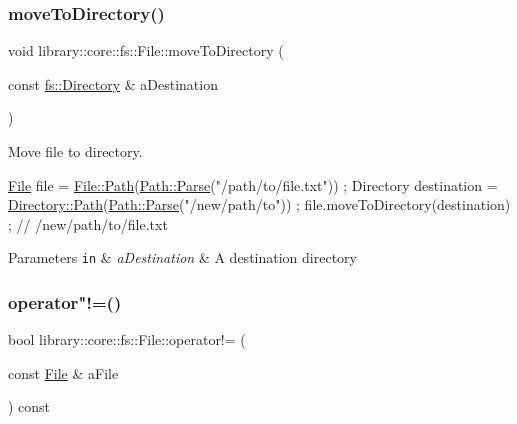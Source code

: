 \subsubsection{\texorpdfstring{move\+To\+Directory()}{moveToDirectory()}}
{\footnotesize\ttfamily void library\+::core\+::fs\+::\+File\+::move\+To\+Directory (\begin{DoxyParamCaption}\item[{const \hyperlink{classlibrary_1_1core_1_1fs_1_1_directory}{fs\+::\+Directory} \&}]{a\+Destination }\end{DoxyParamCaption})}



Move file to directory. 


\begin{DoxyCode}
\hyperlink{classlibrary_1_1core_1_1fs_1_1_file_a7490060f19a21d4ee58bb6cec87a1ca6}{File} file = \hyperlink{classlibrary_1_1core_1_1fs_1_1_file_a0e0d8a8becb3cdd21775554e181452d8}{File::Path}(\hyperlink{classlibrary_1_1core_1_1fs_1_1_path_aebf5bd3af83e0b7376616e146f3e55df}{Path::Parse}(\textcolor{stringliteral}{"/path/to/file.txt"})) ;
Directory destination = \hyperlink{classlibrary_1_1core_1_1fs_1_1_directory_a6d3ea04654841e62a4dbd99feb563caf}{Directory::Path}(\hyperlink{classlibrary_1_1core_1_1fs_1_1_path_aebf5bd3af83e0b7376616e146f3e55df}{Path::Parse}(\textcolor{stringliteral}{"/new/path/to"})) ;
file.moveToDirectory(destination) ; \textcolor{comment}{// /new/path/to/file.txt}
\end{DoxyCode}



\begin{DoxyParams}[1]{Parameters}
\mbox{\tt in}  & {\em a\+Destination} & A destination directory \\
\hline
\end{DoxyParams}
\mbox{\label{classlibrary_1_1core_1_1fs_1_1_file_a0354b6dd59250c07cd5a8b679dc36d95}} 
\subsubsection{\texorpdfstring{operator"!=()}{operator!=()}}
{\footnotesize\ttfamily bool library\+::core\+::fs\+::\+File\+::operator!= (\begin{DoxyParamCaption}\item[{const \hyperlink{classlibrary_1_1core_1_1fs_1_1_file}{File} \&}]{a\+File }\end{DoxyParamCaption}) const}



